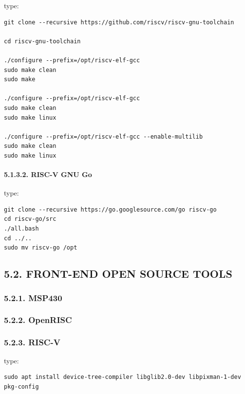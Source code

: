 \documentclass[
]{article}
\begin{document}
type:

\begin{verbatim}
git clone --recursive https://github.com/riscv/riscv-gnu-toolchain

cd riscv-gnu-toolchain

./configure --prefix=/opt/riscv-elf-gcc
sudo make clean
sudo make

./configure --prefix=/opt/riscv-elf-gcc
sudo make clean
sudo make linux

./configure --prefix=/opt/riscv-elf-gcc --enable-multilib
sudo make clean
sudo make linux
\end{verbatim}

\hypertarget{risc-v-gnu-go}{%
\paragraph{5.1.3.2. RISC-V GNU Go}\label{risc-v-gnu-go}}

type:

\begin{verbatim}
git clone --recursive https://go.googlesource.com/go riscv-go
cd riscv-go/src
./all.bash
cd ../..
sudo mv riscv-go /opt
\end{verbatim}

\hypertarget{front-end-open-source-tools-1}{%
\subsection{5.2. FRONT-END OPEN SOURCE
TOOLS}\label{front-end-open-source-tools-1}}

\hypertarget{msp430-1}{%
\subsubsection{5.2.1. MSP430}\label{msp430-1}}

\hypertarget{openrisc-1}{%
\subsubsection{5.2.2. OpenRISC}\label{openrisc-1}}

\hypertarget{risc-v-1}{%
\subsubsection{5.2.3. RISC-V}\label{risc-v-1}}

type:

\begin{verbatim}
sudo apt install device-tree-compiler libglib2.0-dev libpixman-1-dev pkg-config
\end{verbatim}
\end{document}
